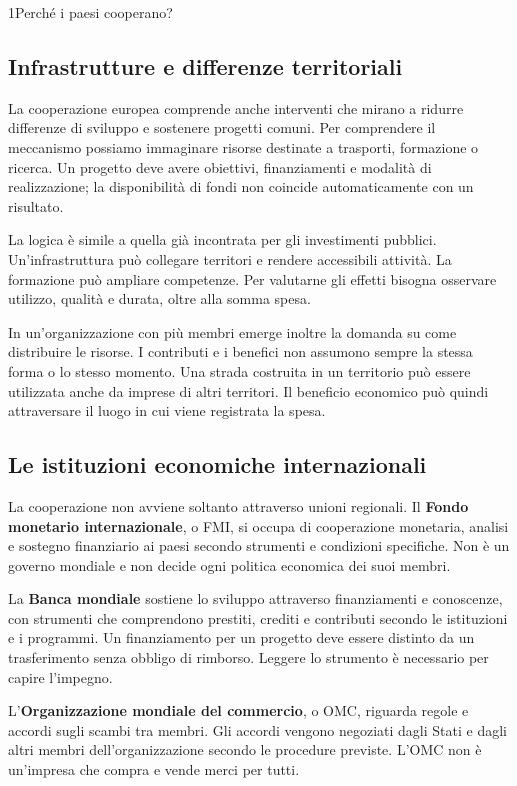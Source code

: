 \begin{lettura}{1}{Perché i paesi cooperano?}
\subsection*{Infrastrutture e differenze territoriali}
La cooperazione europea comprende anche interventi che mirano a ridurre differenze di sviluppo e sostenere progetti comuni. Per comprendere il meccanismo possiamo immaginare risorse destinate a trasporti, formazione o ricerca. Un progetto deve avere obiettivi, finanziamenti e modalità di realizzazione; la disponibilità di fondi non coincide automaticamente con un risultato.

La logica è simile a quella già incontrata per gli investimenti pubblici. Un'infrastruttura può collegare territori e rendere accessibili attività. La formazione può ampliare competenze. Per valutarne gli effetti bisogna osservare utilizzo, qualità e durata, oltre alla somma spesa.

In un'organizzazione con più membri emerge inoltre la domanda su come distribuire le risorse. I contributi e i benefici non assumono sempre la stessa forma o lo stesso momento. Una strada costruita in un territorio può essere utilizzata anche da imprese di altri territori. Il beneficio economico può quindi attraversare il luogo in cui viene registrata la spesa.

\subsection*{Le istituzioni economiche internazionali}
La cooperazione non avviene soltanto attraverso unioni regionali. Il \textbf{Fondo monetario internazionale}, o FMI, si occupa di cooperazione monetaria, analisi e sostegno finanziario ai paesi secondo strumenti e condizioni specifiche. Non è un governo mondiale e non decide ogni politica economica dei suoi membri.

La \textbf{Banca mondiale} sostiene lo sviluppo attraverso finanziamenti e conoscenze, con strumenti che comprendono prestiti, crediti e contributi secondo le istituzioni e i programmi. Un finanziamento per un progetto deve essere distinto da un trasferimento senza obbligo di rimborso. Leggere lo strumento è necessario per capire l'impegno.

L'\textbf{Organizzazione mondiale del commercio}, o OMC, riguarda regole e accordi sugli scambi tra membri. Gli accordi vengono negoziati dagli Stati e dagli altri membri dell'organizzazione secondo le procedure previste. L'OMC non è un'impresa che compra e vende merci per tutti.


\end{lettura}
